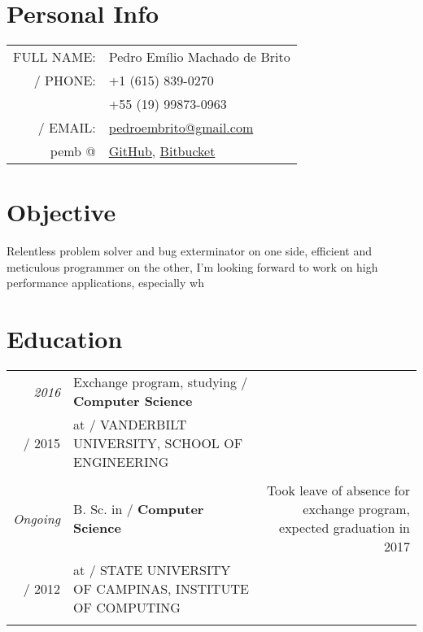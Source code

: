 \documentclass[a4paper,10pt]{article}
\makeatletter
\def\fakesc#1{%
  \begingroup%
  \xdef\fake@name{\csname\curr@fontshape/\f@size\endcsname}%
  \fontsize{\fontdimen8\fake@name}{\baselineskip}\selectfont%
  \uppercase{#1}%
  \endgroup%
}
\renewcommand{\textsc}{\fakesc}
\makeatother
\begin{document}
\pagestyle{empty} %

\par{\centering{\Huge Pedro \textsc{Brito}}\bigskip\par}

\section{Personal Info}

 \begin{tabularx}{\textwidth}{ rl}
 \textsc{Full name:} &
                       Pedro Emílio Machado de Brito \\
    \textsc{Phone:} &
                      +1 (615) 839-0270 \\
                      &+55 (19) 99873-0963 \\
    \textsc{Email:} &
                      \href{mailto:pedroembrito@gmail.com}{pedroembrito@gmail.com}\\
    \footnotesize{pemb @} &
                       \href{https://github.com/pemb/}{GitHub}, \href{https://bitbucket.org/pemb}{Bitbucket}\\
\end{tabularx}

\section{Objective}

Relentless problem solver and bug exterminator on one side, efficient and meticulous programmer on the other, I'm looking forward to work on high performance applications, especially wh

\section{Education}

\begin{tabularx}{\textwidth}{r|Xr}	

  \emph{2016} & Exchange program, studying \textsc{}\textbf{Computer Science} & \\
  \textsc{2015} & at \textsc{Vanderbilt University, School of Engineering}\\ 
  \multicolumn{2}{c}{}\\

  \emph{Ongoing} & B. Sc. in \textsc{}\textbf{Computer Science} & {\tiny Took leave of absence for exchange program, expected graduation in 2017}\\
  \textsc{2012} & at \textsc{State University of Campinas, Institute of Computing}\\ 
  \multicolumn{2}{c}{}\\

\end{tabularx}
\end{document}
